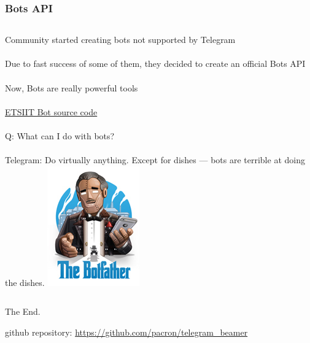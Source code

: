 \documentclass{beamer}
\begin{document}

\begin{frame}
\frametitle{Bots API}
\begin{columns}
Community started creating bots not supported by Telegram\\~\\
Due to fast success of some of them, they decided to create an official Bots API\\~\\
Now, Bots are really powerful tools \\~\\
\href{https://github.com/acasadoquijada/ETSIIT_BOT}{\color{blue}ETSIIT Bot source code}\\~\\
Q: What can I do with bots?\\~\\
Telegram: Do virtually anything. Except for dishes — bots are terrible at doing the dishes.
\includegraphics[scale=0.5]{images/botfather}
\end{columns}
\end{frame}


\begin{frame}
\Huge{\centerline{The End.}}
\large{\centerline{github repository: \href{https://github.com/pacron/telegram_beamer}{\color{blue}https://github.com/pacron/telegram\_beamer}}}
\end{frame}

\end{document}
